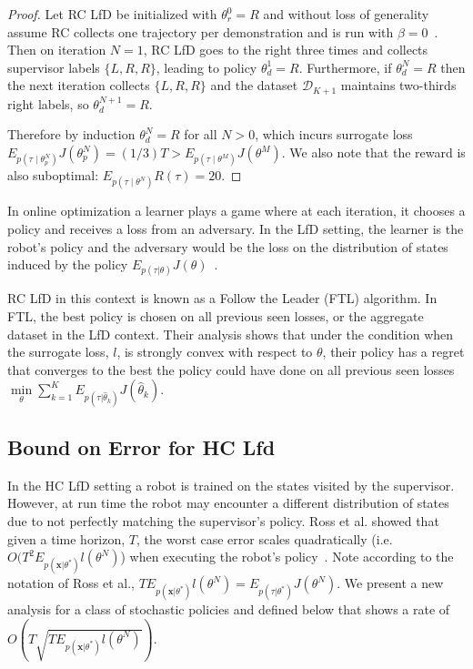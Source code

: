 \documentclass[10pt, conference]{ieeeconf}      %
\newcommand{\bx}{\mathbf{x}}
\newcommand{\mD}{\mathcal{D}}
\newcommand{\nc}{RC LfD }
\begin{document}
\begin{proof}
Let \nc be initialized with $\theta_{r}^0 = R$ and without loss of generality assume RC collects one trajectory per demonstration and is run with $\beta=0$~\cite{ross2010reduction}.
Then on iteration $N=1$, \nc goes to the right three times and collects supervisor labels $\{L, R, R\}$, leading to policy $\theta_{d}^1 = R$.
Furthermore, if $\theta_{d}^N = R$ then the next iteration collects $\{L, R, R\}$ and the dataset $\mD_{K+1}$ maintains two-thirds right labels, so $\theta_{d}^{N+1} = R$.

Therefore by induction $\theta_{d}^{N} = R$ for all $N > 0$, which incurs surrogate loss $E_{p(\tau \mid \theta_{p}^N)} J(\theta_{p}^N) = (1 / 3) T > E_{p(\tau \mid \theta^M)} J(\theta^M)$.
We also note that the reward is also suboptimal: $E_{p(\tau \mid \theta^N)} R(\tau) = 20$.

\end{proof}


In online optimization a learner plays a game where at each iteration, it chooses a policy and receives a loss from an adversary.  In the LfD setting, the learner is the robot's policy and the adversary would be the loss on the distribution of states induced by the policy $E_{p(\tau|\theta)} J(\theta)$~\cite{shalev2011online}.

RC LfD in this context is known as a Follow the Leader (FTL) algorithm. In FTL, the best policy is chosen on all previous seen losses, or the aggregate dataset in the LfD context. Their analysis shows that under the condition when the surrogate loss, $l$, is strongly convex with respect to $\theta$, their policy has a regret that converges to the best the policy could have done on all previous seen losses $\underset{\theta}{\min} \sum_{k=1}^K E_{p(\tau|\hat{\theta}_k)}J(\hat{\theta}_k)$. 


\subsection{Bound on Error for HC Lfd}
In the HC LfD setting a robot is trained on the states visited by the supervisor. However, at run time the robot may encounter a different distribution of states due to not perfectly matching the supervisor's policy. Ross et al. showed that given a time horizon, $T$, the worst case error scales quadratically (i.e. $O(T^2E_{p(\bx|\theta^*)} l(\theta^N)$) when executing the robot's policy~\cite{ross2010efficient}. Note according to the notation of Ross et al., $TE_{p(\bx|\theta^*)} l(\theta^N) = E_{p(\tau|\theta^*)} J(\theta^N)$. We present a new analysis for a class of stochastic policies and  defined below that shows a rate of $O(T\sqrt{TE_{p(\bx|\theta^*)} l(\theta^N)})$.
\end{document}
